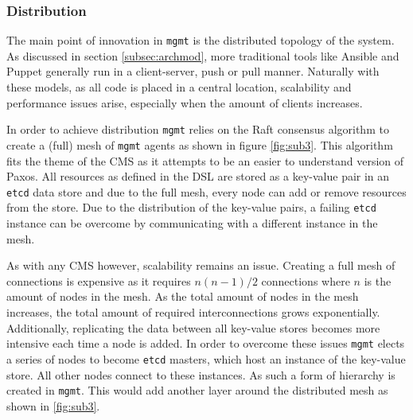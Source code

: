 \subsubsection{Distribution}
The main point of innovation in \texttt{mgmt} is the distributed topology of the system. As discussed in section \ref{subsec:archmod}, more traditional tools like Ansible and Puppet generally run in a client-server, push or pull manner. Naturally with these models, as all code is placed in a central location, scalability and performance issues arise, especially when the amount of clients increases.

In order to achieve distribution \texttt{mgmt} relies on the Raft \cite{ongaro_2016} consensus algorithm to create a (full) mesh of \texttt{mgmt} agents as shown in figure \ref{fig:sub3}. This algorithm fits the theme of the CMS as it attempts to be an easier to understand version of Paxos. All resources as defined in the DSL are stored as a key-value pair in an \texttt{etcd} data store and due to the full mesh, every node can add or remove resources from the store. Due to the distribution of the key-value pairs, a failing \texttt{etcd} instance can be overcome by communicating with a different instance in the mesh. 

As with any CMS however, scalability remains an issue. Creating a full mesh of connections is expensive as it requires $n(n-1)/2$ connections where $n$ is the amount of nodes in the mesh. As the total amount of nodes in the mesh increases, the total amount of required interconnections grows exponentially. Additionally, replicating the data between all key-value stores becomes more intensive each time a node is added. In order to overcome these issues \texttt{mgmt} elects a series of nodes to become \texttt{etcd} masters, which host an instance of the key-value store. All other nodes connect to these instances. As such a form of hierarchy is created in \texttt{mgmt}. This would add another layer around the distributed mesh as shown in \ref{fig:sub3}.

